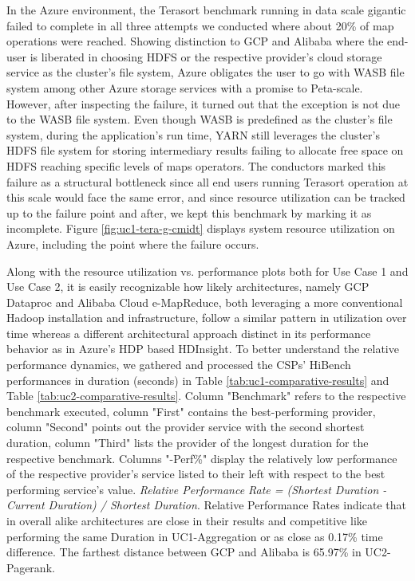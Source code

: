 \documentclass[review]{elsarticle}
\begin{document}
In the Azure environment, the Terasort benchmark running in data scale gigantic failed to complete in all three attempts we conducted where about 20\% of map operations were reached. Showing distinction to GCP and Alibaba where the end-user is liberated in choosing HDFS or the respective provider's cloud storage service as the cluster's file system, Azure obligates the user to go with WASB file system among other Azure storage services with a promise to Peta-scale. However, after inspecting the failure, it turned out that the exception is not due to the WASB file system. Even though WASB is predefined as the cluster's file system, during the application's run time, YARN still leverages the cluster's HDFS file system for storing intermediary results failing to allocate free space on HDFS reaching specific levels of maps operators. The conductors marked this failure as a structural bottleneck since all end users running Terasort operation at this scale would face the same error, and since resource utilization can be tracked up to the failure point and after, we kept this benchmark by marking it as incomplete. Figure \ref{fig:uc1-tera-g-cmidt} displays system resource utilization on Azure, including the point where the failure occurs.

Along with the resource utilization vs. performance plots both for Use Case 1 and Use Case 2, it is easily recognizable how likely architectures, namely GCP Dataproc and Alibaba Cloud e-MapReduce, both leveraging a more conventional Hadoop installation and infrastructure, follow a similar pattern in utilization over time whereas a different architectural approach distinct in its performance behavior as in Azure's HDP based HDInsight. To better understand the relative performance dynamics, we gathered and processed the CSPs' HiBench performances in duration (seconds) in Table \ref{tab:uc1-comparative-results} and Table \ref{tab:uc2-comparative-results}. Column "Benchmark" refers to the respective benchmark executed, column "First" contains the best-performing provider, column "Second" points out the provider service with the second shortest duration, column "Third" lists the provider of the longest duration for the respective benchmark. Columns "-Perf\%" display the relatively low performance of the respective provider's service listed to their left with respect to the best performing service's value. \textit{Relative Performance Rate = (Shortest Duration - Current Duration) / Shortest Duration}. Relative Performance Rates indicate that in overall alike architectures are close in their results and competitive like performing the same Duration in UC1-Aggregation or as close as 0.17\% time difference. The farthest distance between GCP and Alibaba is 65.97\% in UC2-Pagerank.
\end{document}

